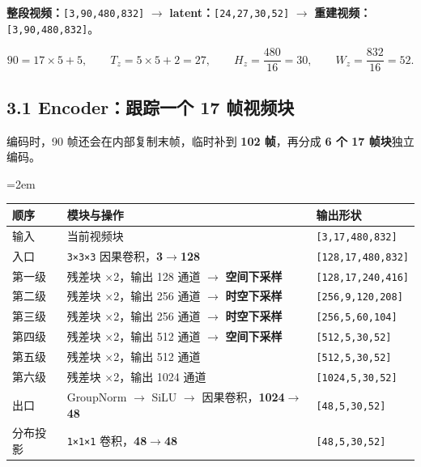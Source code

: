 \documentclass[
  11pt,
  a4paper,
  fontset=none]{ctexart}
\newcounter{none} %
\newcommand{\NotesTableStyle}{\linespread{1}\fontsize{9.5pt}{13pt}\selectfont\setlength{\tabcolsep}{4pt}\renewcommand{\arraystretch}{1.1}\setlength{\extrarowheight}{5pt}\setlength{\LTpre}{5pt}\setlength{\LTpost}{6pt}\setlength{\parskip}{0pt}\emergencystretch=2em}
\begin{document}
\textbf{整段视频：}\texttt{{[}3,90,480,832{]}} \(\rightarrow\)
\textbf{latent：}\texttt{{[}24,27,30,52{]}} \(\rightarrow\)
\textbf{重建视频：}\texttt{{[}3,90,480,832{]}}。

\[
90=17\times5+5,\qquad T_z=5\times5+2=27,\qquad H_z=\frac{480}{16}=30,\qquad W_z=\frac{832}{16}=52.
\]


\subsection{3.1 Encoder：跟踪一个 17 帧视频块}\label{h3-encoder}

编码时，90 帧还会在内部复制末帧，临时补到 \textbf{102 帧}，再分成
\textbf{6 个 17 帧块}独立编码。

\begingroup\NotesTableStyle\fontsize{10.5pt}{14pt}\selectfont\renewcommand{\arraystretch}{1.08}\setlength{\extrarowheight}{3pt}

{\def\LTcaptype{none} %
\begin{longtable}[]{@{}
  >{\raggedright\arraybackslash}p{}
  >{\raggedright\arraybackslash}p{}
  >{\raggedright\arraybackslash}p{}@{}}
\toprule\noalign{}
\begin{minipage}[b]{\linewidth}\raggedright
顺序
\end{minipage} & \begin{minipage}[b]{\linewidth}\raggedright
模块与操作
\end{minipage} & \begin{minipage}[b]{\linewidth}\raggedright
输出形状
\end{minipage} \\
\midrule\noalign{}
\endhead
\bottomrule\noalign{}
\endlastfoot
输入 & 当前视频块 & \texttt{{[}3,17,480,832{]}} \\
入口 & \texttt{3×3×3} 因果卷积，\textbf{3\(\rightarrow\)128} &
\texttt{{[}128,17,480,832{]}} \\
第一级 & 残差块 ×2，输出 128 通道 \(\rightarrow\) \textbf{空间下采样} &
\texttt{{[}128,17,240,416{]}} \\
第二级 & 残差块 ×2，输出 256 通道 \(\rightarrow\) \textbf{时空下采样} &
\texttt{{[}256,9,120,208{]}} \\
第三级 & 残差块 ×2，输出 256 通道 \(\rightarrow\) \textbf{时空下采样} &
\texttt{{[}256,5,60,104{]}} \\
第四级 & 残差块 ×2，输出 512 通道 \(\rightarrow\) \textbf{空间下采样} &
\texttt{{[}512,5,30,52{]}} \\
第五级 & 残差块 ×2，输出 512 通道 & \texttt{{[}512,5,30,52{]}} \\
第六级 & 残差块 ×2，输出 1024 通道 & \texttt{{[}1024,5,30,52{]}} \\
出口 & GroupNorm \(\rightarrow\) SiLU \(\rightarrow\)
因果卷积，\textbf{1024\(\rightarrow\)48} & \texttt{{[}48,5,30,52{]}} \\
分布投影 & \texttt{1×1×1} 卷积，\textbf{48\(\rightarrow\)48} &
\texttt{{[}48,5,30,52{]}} \\
\end{longtable}
}
\end{document}
